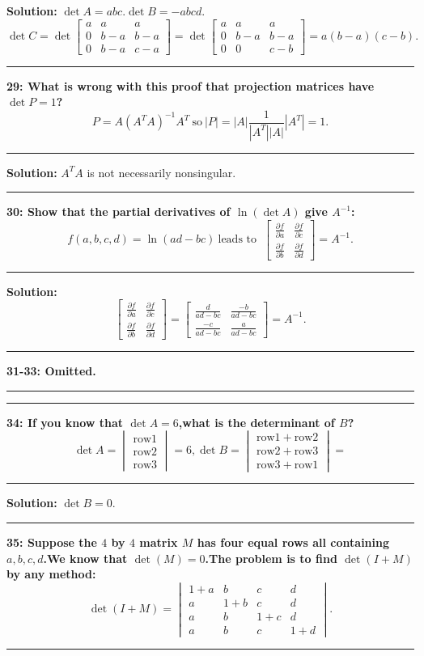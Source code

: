 \documentclass[11pt]{article}
\newcommand\question[2]{\vspace{.25in}\hrule\textbf{#1: #2}\vspace{.5em}\hrule\vspace{.10in}}
\newcommand\solution{\vspace{.10in}\textbf{Solution: }}
\begin{document}
\solution $\det A=abc$.$\det B=-abcd$.
$$
\det C=\det
\begin{bmatrix}
  a&a&a\\
  0&b-a&b-a\\
  0&b-a&c-a
\end{bmatrix}=\det
\begin{bmatrix}
  a&a&a\\
  0&b-a&b-a\\
  0&0&c-b
\end{bmatrix}=a(b-a)(c-b).
$$
\question{29}{What is wrong with this proof that projection matrices
  have $\det P=1$?
$$
P=A(A^TA)^{-1}A^T~\mbox{so}~|P|=|A|\frac{1}{|A^T||A|}|A^T|=1.
$$
}
\solution $A^TA$ is not necessarily nonsingular.
\question{30}{Show that the partial derivatives of $\ln (\det A)$ give
$A^{-1}$:
$$f(a,b,c,d)=\ln (ad-bc)~\mbox{leads to }~
\begin{bmatrix}
  \frac{\partial f}{\partial a}&\frac{\partial f}{\partial c}\\
  \frac{\partial f}{\partial b}&\frac{\partial f}{\partial d}
\end{bmatrix}=A^{-1}.
$$
}
\solution 
$$
\begin{bmatrix}
  \frac{\partial f}{\partial a}&\frac{\partial f}{\partial c}\\
  \frac{\partial f}{\partial b}&\frac{\partial f}{\partial d}
\end{bmatrix}=
\begin{bmatrix}
  \frac{d}{ad-bc}&\frac{-b}{ad-bc}\\
  \frac{-c}{ad-bc}&\frac{a}{ad-bc}
\end{bmatrix}=A^{-1}.
$$
\question{31-33}{Omitted.}
\question{34}{If you know that $\det A=6$,what is the determinant of
  $B$?
$$
\det A=
\begin{vmatrix}
  \mbox{row}1\\
\mbox{row}2\\
\mbox{row}3
\end{vmatrix}=6,\det B=
\begin{vmatrix}
  \mbox{row}1+\mbox{row}2\\
  \mbox{row}2+\mbox{row}3\\
  \mbox{row}3+\mbox{row}1
\end{vmatrix}=
$$
}
\solution $\det B=0$.
\question{35}{Suppose the $4$ by $4$ matrix $M$ has four equal rows
  all containing $a,b,c,d$.We know that $\det (M)=0$.The problem is to
find $\det (I+M)$ by any method:
$$
\det (I+M)=
\begin{vmatrix}
  1+a&b&c&d\\
  a&1+b&c&d\\
  a&b&1+c&d\\
  a&b&c&1+d
\end{vmatrix}.
$$
}
\end{document}

